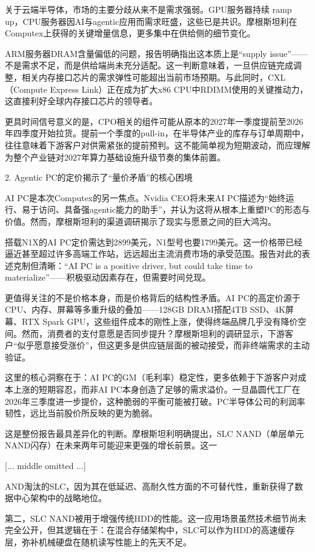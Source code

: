 \documentclass[11pt]{ctexart}
\begin{document}
关于云端半导体，市场的主要分歧从来不是需求强弱。GPU服务器持续 ramp up，CPU服务器因AI与agentic应用而需求旺盛，这些已是共识。摩根斯坦利在Computex上获得的关键增量信息，更多集中在供给侧的细节变化。

ARM服务器DRAM含量偏低的问题，报告明确指出这本质上是“supply issue”——不是需求不足，而是供给端尚未充分适配。这一判断意味着，一旦供应链完成调整，相关内存接口芯片的需求弹性可能超出当前市场预期。与此同时，CXL（Compute Express Link）正在成为扩大x86 CPU中RDIMM使用的关键推动力，这直接利好全球内存接口芯片的领导者。

更具时间信号意义的是，CPO相关的组件可能从原本的2027年一季度提前至2026年四季度开始拉货。提前一个季度的pull-in，在半导体产业的库存与订单周期中，往往意味着下游客户对供需紧张的提前预判。这不能简单视为短期波动，而应理解为整个产业链对2027年算力基础设施升级节奏的集体前置。

2. Agentic PC的定价揭示了“量价矛盾”的核心困境

AI PC是本次Computex的另一焦点。Nvidia CEO将未来AI PC描述为“始终运行、易于访问、具备强agentic能力的助手”，并认为这将从根本上重塑PC的形态与价值。然而，摩根斯坦利的渠道调研揭示了现实与愿景之间的巨大鸿沟。

搭载N1X的AI PC定价需达到2899美元，N1型号也要1799美元。这一价格带已经逼近甚至超过许多高端工作站，远远超出主流消费市场的承受范围。报告对此的表述克制但清晰：“AI PC is a positive driver, but could take time to materialize”——积极驱动因素存在，但需要时间兑现。

更值得关注的不是价格本身，而是价格背后的结构性矛盾。AI PC的高定价源于CPU、内存、屏幕等多重升级的叠加——128GB DRAM搭配4TB SSD、4K屏幕、RTX Spark GPU，这些组件成本的刚性上涨，使得终端品牌几乎没有降价空间。然而，消费者的支付意愿是否同步提升？摩根斯坦利的调研显示，下游客户“似乎愿意接受涨价”，但这更多是供应链层面的被动接受，而非终端需求的主动验证。

这里的核心洞察在于：AI PC的GM（毛利率）稳定性，更多依赖于下游客户对成本上涨的短期容忍，而非AI PC本身创造了足够的需求溢价。一旦晶圆代工厂在2026年三季度进一步提价，这种脆弱的平衡可能被打破。PC半导体公司的利润率韧性，远比当前股价所反映的更为脆弱。

这是整份报告最具差异化的判断。摩根斯坦利明确提出，SLC NAND（单层单元NAND闪存）在未来两年可能迎来更强的增长前景。这一

[... middle omitted ...]

AND淘汰的SLC，因为其在低延迟、高耐久性方面的不可替代性，重新获得了数据中心架构中的战略地位。

第二，SLC NAND被用于增强传统HDD的性能。这一应用场景虽然技术细节尚未完全公开，但其逻辑在于：在混合存储架构中，SLC可以作为HDD的高速缓存层，弥补机械硬盘在随机读写性能上的先天不足。
\end{document}
